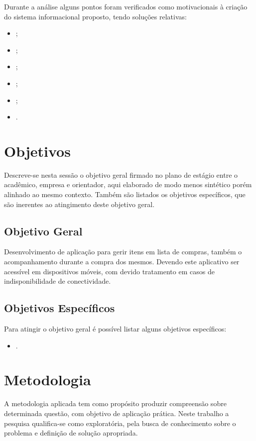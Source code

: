 \documentclass[
	12pt,
	openright,
	oneside, %
	a4paper,
	chapter=TITLE,
	section=TITLE,
	english,
	brazil %
	]{abntex2-udesc}
\begin{document}
Durante a análise alguns pontos foram verificados como motivacionais à criação do sistema informacional proposto, tendo soluções relativas:

\begin{itemize}
\item ;
\item ;
\item ;
\item ;
\item ;
\item .
\end{itemize}

\section{Objetivos}

Descreve-se nesta sessão o objetivo geral firmado no plano de estágio entre o acadêmico, empresa e orientador, aqui elaborado de modo menos sintético porém alinhado ao mesmo contexto. Também são listados os objetivos específicos, que são inerentes ao atingimento deste objetivo geral.

\subsection{Objetivo Geral}

Desenvolvimento de aplicação para gerir itens em lista de compras, também o acompanhamento durante a compra dos mesmos. Devendo este aplicativo ser acessível em dispositivos móveis, com devido tratamento em casos de indisponibilidade de conectividade.

\subsection{Objetivos Específicos}

Para atingir o objetivo geral é possível listar alguns objetivos específicos:

\begin{itemize}
\item .
\end{itemize}

\section{Metodologia}

A metodologia aplicada tem como propósito produzir compreensão sobre determinada questão, com objetivo de aplicação prática. Neste trabalho a pesquisa qualifica-se como exploratória, pela busca de conhecimento sobre o problema e definição de solução apropriada.
\end{document}
